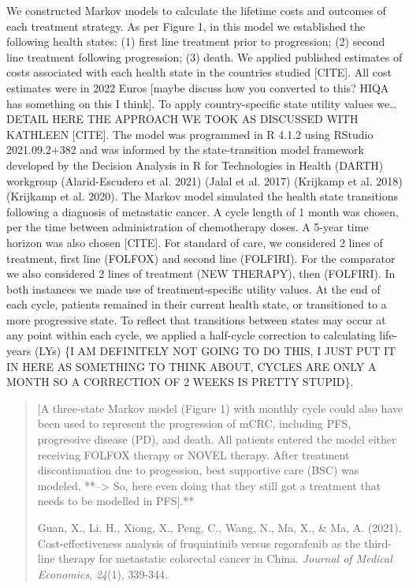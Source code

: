 \documentclass[
]{article}
\begin{document}
We constructed Markov models to calculate the lifetime costs and
outcomes of each treatment strategy. As per Figure 1, in this model we
established the following health states: (1) first line treatment prior
to progression; (2) second line treatment following progression; (3)
death. We applied published estimates of costs associated with each
health state in the countries studied {[}CITE{]}. All cost estimates
were in 2022 Euros {[}maybe discuss how you converted to this? HIQA has
something on this I think{]}. To apply country-specific state utility
values we\ldots DETAIL HERE THE APPROACH WE TOOK AS DISCUSSED WITH
KATHLEEN {[}CITE{]}. The model was programmed in R 4.1.2 using RStudio
2021.09.2+382 and was informed by the state-transition model framework
developed by the Decision Analysis in R for Technologies in Health
(DARTH) workgroup (Alarid-Escudero et al. 2021) (Jalal et al. 2017)
(Krijkamp et al. 2018) (Krijkamp et al. 2020). The Markov model
simulated the health state transitions following a diagnosis of
metastatic cancer. A cycle length of 1 month was chosen, per the time
between administration of chemotherapy doses. A 5-year time horizon was
also chosen {[}CITE{]}. For standard of care, we considered 2 lines of
treatment, first line (FOLFOX) and second line (FOLFIRI). For the
comparator we also considered 2 lines of treatment (NEW THERAPY), then
(FOLFIRI). In both instances we made use of treatment-specific utility
values. At the end of each cycle, patients remained in their current
health state, or transitioned to a more progressive state. To reflect
that transitions between states may occur at any point within each
cycle, we applied a half-cycle correction to calculating life-years
(LYs) \{I AM DEFINITELY NOT GOING TO DO THIS, I JUST PUT IT IN HERE AS
SOMETHING TO THINK ABOUT, CYCLES ARE ONLY A MONTH SO A CORRECTION OF 2
WEEKS IS PRETTY STUPID\}.

\begin{quote}
{[}A three-state Markov model (Figure 1) with monthly cycle could also
have been used to represent the progression of mCRC, including PFS,
progressive disease (PD), and death. All patients entered the model
either receiving FOLFOX therapy or NOVEL therapy. After treatment
discontinuation due to progession, best supportive care (BSC) was
modeled. **--\textgreater{} So, here even doing that they still got a
treatment that needs to be modelled in PFS{]}.**

Guan, X., Li, H., Xiong, X., Peng, C., Wang, N., Ma, X., \& Ma, A.
(2021). Cost-effectiveness analysis of fruquintinib versus regorafenib
as the third-line therapy for metastatic colorectal cancer in China.
\emph{Journal of Medical Economics}, \emph{24}(1), 339-344.
\end{quote}
\end{document}
